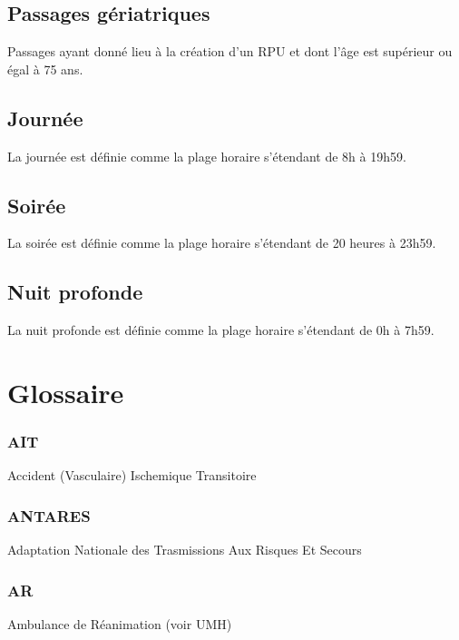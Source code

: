 \documentclass[12pt,english,french,twoside]{book}\usepackage[]{graphicx}\usepackage[]{color}
\begin{document}
\section*{Passages gériatriques}
Passages ayant donné lieu à la création d'un RPU et dont l'âge est supérieur ou égal à 75 ans.

\section*{Journée}
La journée est définie comme la plage horaire s'étendant de 8h à 19h59.

\section*{Soirée}
La soirée est définie comme la plage horaire s'étendant de 20 heures à 23h59.

\section*{Nuit profonde}
La nuit profonde est définie comme la plage horaire s'étendant de 0h à 7h59.




\newpage
\chapter{Glossaire}





\subsection*{AIT}
Accident (Vasculaire) Ischemique Transitoire

\subsection*{ANTARES}
Adaptation Nationale des Trasmissions Aux Risques Et Secours

\subsection*{AR}
Ambulance de Réanimation (voir UMH)
\end{document}

